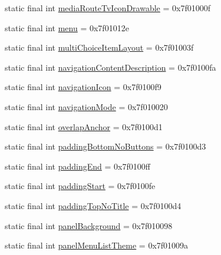 \begin{CompactItemize}
\item 
static final int \hyperlink{classandroid_1_1support_1_1graphics_1_1drawable_1_1_r_1_1attr_d38f866d8e4f17061aae25a6fe1066c7}{mediaRouteTvIconDrawable} = 0x7f01000f
\item 
static final int \hyperlink{classandroid_1_1support_1_1graphics_1_1drawable_1_1_r_1_1attr_a9230761a4eb913b0b899365b8a3d621}{menu} = 0x7f01012e
\item 
static final int \hyperlink{classandroid_1_1support_1_1graphics_1_1drawable_1_1_r_1_1attr_f41326fdc5518c451b962af6f48530b4}{multiChoiceItemLayout} = 0x7f01003f
\item 
static final int \hyperlink{classandroid_1_1support_1_1graphics_1_1drawable_1_1_r_1_1attr_b82476937fd5fd3cc7df3581fe2cd334}{navigationContentDescription} = 0x7f0100fa
\item 
static final int \hyperlink{classandroid_1_1support_1_1graphics_1_1drawable_1_1_r_1_1attr_64e586c6cfc93c6cb1250ec3cda3166f}{navigationIcon} = 0x7f0100f9
\item 
static final int \hyperlink{classandroid_1_1support_1_1graphics_1_1drawable_1_1_r_1_1attr_2687debde9d4ed0bd2624ffe98931683}{navigationMode} = 0x7f010020
\item 
static final int \hyperlink{classandroid_1_1support_1_1graphics_1_1drawable_1_1_r_1_1attr_8d1cadd5be52c9dae1ba54b63e0e108a}{overlapAnchor} = 0x7f0100d1
\item 
static final int \hyperlink{classandroid_1_1support_1_1graphics_1_1drawable_1_1_r_1_1attr_267837666e1c22b9c7a367cb53834d3b}{paddingBottomNoButtons} = 0x7f0100d3
\item 
static final int \hyperlink{classandroid_1_1support_1_1graphics_1_1drawable_1_1_r_1_1attr_b549df6cccbcf6ceddb8823771296e70}{paddingEnd} = 0x7f0100ff
\item 
static final int \hyperlink{classandroid_1_1support_1_1graphics_1_1drawable_1_1_r_1_1attr_1783e1c72b921c814fb3657bd317850c}{paddingStart} = 0x7f0100fe
\item 
static final int \hyperlink{classandroid_1_1support_1_1graphics_1_1drawable_1_1_r_1_1attr_f83f52938cb89233320a3e16b0d23df3}{paddingTopNoTitle} = 0x7f0100d4
\item 
static final int \hyperlink{classandroid_1_1support_1_1graphics_1_1drawable_1_1_r_1_1attr_c8f0141790c979d80aa44463cee1d22e}{panelBackground} = 0x7f010098
\item 
static final int \hyperlink{classandroid_1_1support_1_1graphics_1_1drawable_1_1_r_1_1attr_af4af198820e7c4415b366d98400c2b9}{panelMenuListTheme} = 0x7f01009a

\end{CompactItemize}
